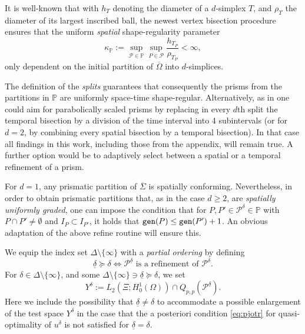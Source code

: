 \documentclass{amsart}
\numberwithin{equation}{section}
\newcommand{\1}{\mathbb 1}
\newcommand{\be}{\begin{equation}}
\newcommand{\ee}{\end{equation}}
\newcommand{\bbP}{\mathbb{P}}
\newcommand{\pria}{{\mathcal P}}
\newcommand{\gen}{{\tt gen}}
\begin{document}
It is well-known that with $h_{T}$ denoting the diameter of a $d$-simplex $T$, and $\rho_{T}$ the diameter of its largest inscribed ball, the newest vertex bisection procedure ensures that the uniform \emph{spatial} shape-regularity parameter
$$
\kappa_\bbP:=\sup_{\pria \in \bbP} \sup_{P \in \pria} \frac{h_{T_P}}{\rho_{T_P}}<\infty,
$$
only dependent on the initial partition of $\overline{\Omega}$ into $d$-simplices.

\begin{remark} The definition of the \emph{splits} guarantees that consequently the prisms from the partitions in $\bbP$ are uniformly space-time shape-regular. 
Alternatively, as in \cite{64.587} one could aim for parabolically scaled prisms by replacing in every $d$th split the temporal bisection by a division of the time interval into 4 subintervals (or for $d=2$, by combining every spatial bisection by a temporal bisection).  In that case all findings in this work, including those from the appendix, will remain true.
A further option would be to adaptively select between a spatial or a temporal refinement of a prism.
\end{remark}

\begin{remark} \label{rem:one-dimensional-grading}
For $d=1$, any prismatic partition of $\overline{\Sigma}$ is spatially conforming.
Nevertheless, in order to obtain prismatic partitions that, as in the case $d \geq 2$, are \emph{spatially uniformly graded}, one can impose the condition that for $P,P' \in \pria^\delta \in \bbP$ with $P \cap P' \neq \emptyset$ and $I_P \subset I_{P'}$, it holds that  $\gen(P) \leq \gen(P')+1$.
An obvious adaptation of the above refine routine will ensure this.
\end{remark}


We equip the index set $\Delta\setminus\{\infty\}$ with a \emph{partial ordering} by defining
$$
\underline{\delta} \succeq \delta \Longleftrightarrow \pria^{\underline{\delta}} \text{ is a refinement of } \pria^\delta.
$$
For $\delta \in \Delta\setminus\{\infty\}$, and some $\Delta\setminus\{\infty\} \ni \underline{\delta} \succeq \delta$, we set
\be \label{eq:106}
Y^\delta:=L_2(\Xi;H_0^1(\Omega)) \cap Q_{p,p}(\pria^{\underline{\delta}}).
\ee
Here we include the possibility that $\underline{\delta} \neq \delta$ to accommodate a possible enlargement of the test space $Y^\delta$ in the case that the a posteriori condition \eqref{eq:pjotr} for quasi-optimality of $u^\delta$ is not satisfied for $\underline{\delta} = \delta$.
\medskip
\end{document}
